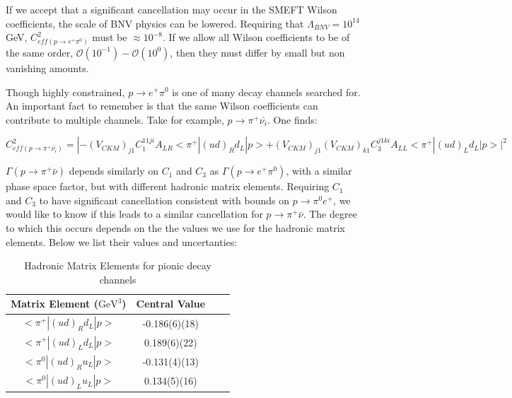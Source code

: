 \documentclass[aps,onecolumn,twoside,secnumarabic,balancelastpage,amsmath,amssymb,nofootinbib,hyperref=pdftex]{revtex4}
\begin{document}
If we accept that a significant cancellation may occur in the SMEFT Wilson coefficients, the scale of BNV physics can be lowered. Requiring that $\Lambda_{BNV} = 10^{14}$ GeV, $C^{2}_{eff(p \rightarrow e^{+}\pi^{0})}$ must be $\approx 10^{-8}$. If we allow all Wilson coefficients to be of the same order, $\mathcal{O}(10^{-1}) - \mathcal{O}(10^{0})$, then they must differ by small but non vanishing amounts. 

Though highly constrained, $p \rightarrow e^{+}\pi^{0}$ is one of many decay channels searched for. An important fact to remember is that the same Wilson coefficients can contribute to multiple channels. Take for example, $p\rightarrow \pi^{+}\bar{\nu_{i}}$. One finds:

\begin{equation}
C^{2}_{eff(p \rightarrow \pi^{+}\bar{\nu_{i}})} = |-(V_{CKM})_{j1}C^{11ji}_{1}A_{LR}<\pi^{+}|(ud)_{R}d_{L}|p> + (V_{CKM})_{j1}(V_{CKM})_{k1}C^{j1ki}_{3}A_{LL}<\pi^{+}|(ud)_{L}d_{L}|p>|^{2}
\end{equation}


$\Gamma(p\rightarrow \pi^{+}\bar{\nu})$ depends similarly on $C_{1}$ and $C_{3}$ as $\Gamma (p \rightarrow e^{+}\pi^{0})$, with a similar phase space factor, but with different hadronic matrix elements. Requiring $C_{1}$ and $C_{3}$ to have significant cancellation consistent with bounds on $p\rightarrow \pi^{0}e^{+}$, we would like to know if this leads to a similar cancellation for $p\rightarrow\pi^{+}\bar{\nu}$. The degree to which this occurs depends on the the values we use for the hadronic matrix elements. Below we list their values and uncertanties:

\begin{table}[htp]
\caption{Hadronic Matrix Elements for pionic decay channels}
\begin{center}
\begin{tabular}{| |c|c|c|c| |}
\hline
Matrix Element ($\text{GeV}^{3}$) & Central Value\\
\hline\hline
$<\pi^{+}|(ud)_{R}d_{L}|p>$ & -0.186(6)(18)\\
\hline
$<\pi^{+}|(ud)_{L}d_{L}|p>$ & 0.189(6)(22)\\
\hline
$<\pi^{0}|(ud)_{R}u_{L}|p>$ & -0.131(4)(13)\\
\hline
$<\pi^{0}|(ud)_{L}u_{L}|p>$ & 0.134(5)(16) \\
\hline
\end{tabular}
\end{center}
\label{table:hadrons}
\end{table}
\end{document}
